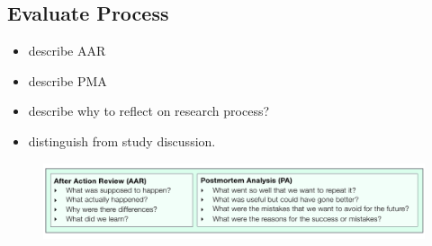 
\subsection{Evaluate Process}
\label{subsec:evaluate process}


\begin{itemize}
	\item describe AAR
	\item describe PMA
	\item describe why to reflect on research process?
	\item distinguish from study discussion.
\end{itemize}
\begin{figure}
	\centering
	\includegraphics[width=12.5cm]{figures/aar_pma.pdf}
	\caption{}
	\label{fig:aar_pma}
\end{figure}